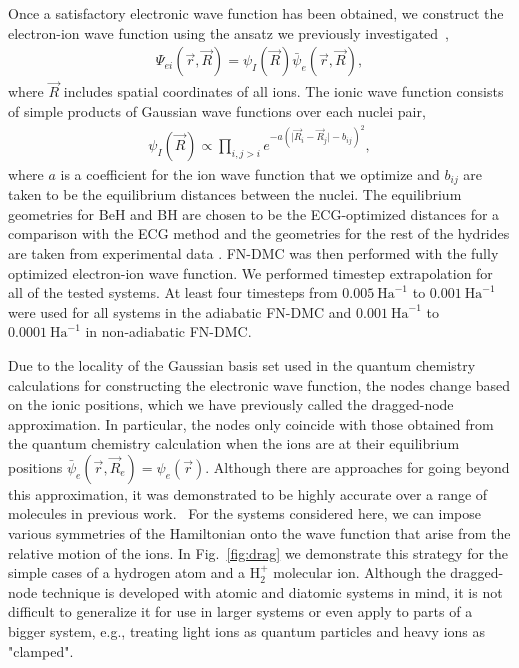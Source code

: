 \documentclass[pra,superscriptaddress,groupedaddress,twocolumn]{revtex4}
\begin{document}
Once a satisfactory electronic wave function has been obtained, we construct the electron-ion wave function using the ansatz we previously investigated~\cite{Tubman_ECG},
\begin{align}
\Psi_{ei}(\vec{r},\vec{R})=\psi_I(\vec{R})\bar{\psi}_e(\vec{r},\vec{R}), \label{eq:psi}
\end{align}
where $\vec{R}$ includes spatial coordinates of all ions. The ionic wave function consists of simple products of Gaussian wave functions over each nuclei pair,
\begin{align}
\psi_I(\vec{R})\propto \prod\limits_{i,j>i}e^{-a(\vert \vec{R}_i-\vec{R}_j\vert-b_{ij})^2},
\label{wfs_ions}
\end{align}
where $a$ is a coefficient for the ion wave function that we optimize and $b_{ij}$ are taken to be the equilibrium distances between the nuclei. The equilibrium geometries for BeH and BH are chosen to be the ECG-optimized distances for a comparison with the ECG method and the geometries for the rest of the hydrides are taken from experimental data \cite{CCCBDB}. FN-DMC was then performed with the fully optimized electron-ion wave function. We performed timestep extrapolation for all of the tested systems. At least four timesteps from $0.005~\text{Ha}^{-1}$ to $0.001~\text{Ha}^{-1}$ were used for all systems in the adiabatic FN-DMC and $0.001~\text{Ha}^{-1}$ to $0.0001~\text{Ha}^{-1}$ in non-adiabatic FN-DMC.

Due to the locality of the Gaussian basis set used in the quantum chemistry calculations for constructing the electronic wave function, the nodes change based on the ionic positions, which we have previously called the dragged-node approximation. In particular, the nodes only coincide with those obtained from the quantum chemistry calculation when the ions are at their equilibrium positions $\bar{\psi}_e(\vec{r},\vec{R}_e)=\psi_e(\vec{r})$. Although there are approaches for going beyond this approximation, it was demonstrated to be highly accurate over a range of molecules in previous work.~\cite{Tubman_ECG} For the systems considered here, we can impose various symmetries of the Hamiltonian onto the wave function that arise from the relative motion of the ions. In Fig.~\ref{fig:drag} we demonstrate this strategy for the simple cases of a hydrogen atom and a H$_2^+$ molecular ion. Although the dragged-node technique is developed with atomic and diatomic systems in mind, it is not difficult to generalize it for use in larger systems or even apply to parts of a bigger system, e.g., treating light ions as quantum particles and heavy ions as "clamped". 
\end{document}
